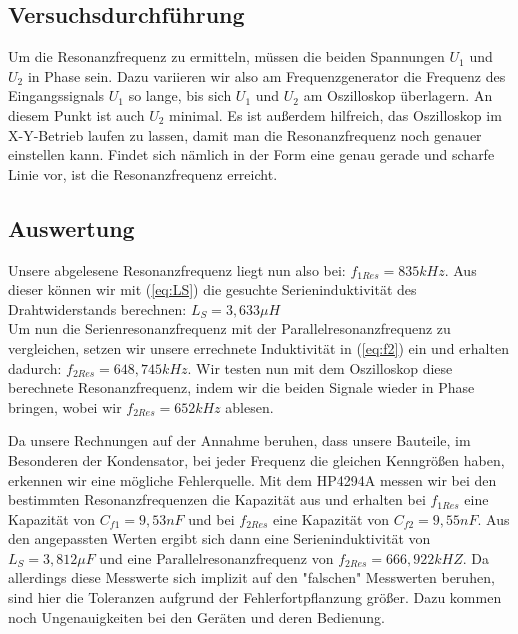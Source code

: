 \documentclass{article}
\begin{document}
\subsection{Versuchsdurchführung}
Um die Resonanzfrequenz zu ermitteln, müssen die beiden Spannungen $U_1$ und $U_2$ in Phase sein.
Dazu variieren wir also am Frequenzgenerator die Frequenz des Eingangssignals $U_1$ so lange, bis sich
$U_1$ und $U_2$ am Oszilloskop überlagern. An diesem Punkt ist auch $U_2$ minimal.
Es ist außerdem hilfreich, das Oszilloskop im X-Y-Betrieb laufen zu lassen, damit man die Resonanzfrequenz noch genauer einstellen kann.
Findet sich nämlich in der Form eine genau gerade und scharfe Linie vor, ist die Resonanzfrequenz erreicht.

\subsection{Auswertung}

Unsere abgelesene Resonanzfrequenz liegt nun also bei: $f_{1Res} = 835kHz$.
Aus dieser können wir mit (\ref{eq:LS}) die gesuchte Serieninduktivität des Drahtwiderstands berechnen: $L_S = 3,633\mu H$\\[3pt]
Um nun die Serienresonanzfrequenz mit der Parallelresonanzfrequenz zu vergleichen, setzen wir unsere errechnete Induktivität in
(\ref{eq:f2}) ein und erhalten dadurch: $f_{2Res} = 648,745kHz$. Wir testen nun mit dem Oszilloskop diese berechnete Resonanzfrequenz, indem wir
die beiden Signale wieder in Phase bringen, wobei wir $f_{2Res} = 652kHz$ ablesen.

Da unsere Rechnungen auf der Annahme beruhen, dass unsere Bauteile, im Besonderen der Kondensator, bei jeder Frequenz die gleichen Kenngrößen haben,
erkennen wir eine mögliche Fehlerquelle. Mit dem HP4294A messen wir bei den bestimmten Resonanzfrequenzen die Kapazität aus und erhalten bei $f_{1Res}$ eine Kapazität
von $C_{f1}=9,53nF$ und bei $f_{2Res}$ eine Kapazität von $C_{f2} = 9,55nF$. Aus den angepassten Werten ergibt sich dann eine Serieninduktivität von $L_S = 3,812\mu F$
und eine Parallelresonanzfrequenz von $f_{2Res} = 666,922kHZ$. Da allerdings diese Messwerte sich implizit auf den "falschen" Messwerten beruhen, sind hier die Toleranzen aufgrund der
Fehlerfortpflanzung größer. Dazu kommen noch Ungenauigkeiten bei den Geräten und deren Bedienung.


\newpage
\end{document}
